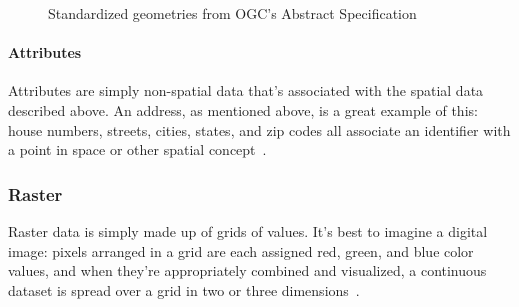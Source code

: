 \begin{figure}
      \hfill
        \hfill
{}
       \hfill
{}
    
    \caption{Standardized geometries from OGC's Abstract Specification}
    \label{fig:geoms}
    
\end{figure}

\paragraph{Attributes}
Attributes are simply non-spatial data that's associated with the spatial data described above. An address, as mentioned above, is a great example of this: house numbers, streets, cities, states, and zip codes all associate an identifier with a point in space or other spatial concept~\cite{gentle_intro}.

\subsubsection{Raster}
Raster data is simply made up of grids of values. It's best to imagine a digital image: pixels arranged in a grid are each assigned red, green, and blue color values, and when they're appropriately combined and visualized, a continuous dataset is spread over a grid in two or three dimensions~\cite{gentle_intro}.

